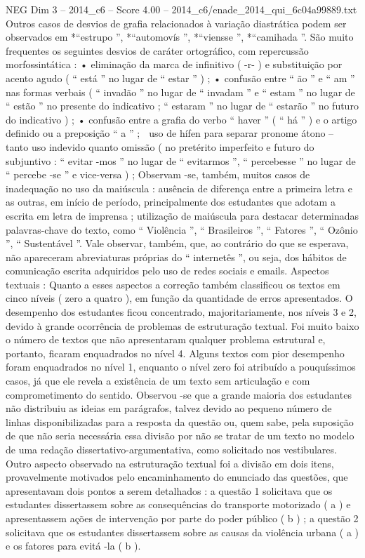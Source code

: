 \begin{textsample}{NEG Dim 3 – 2014\_c6 – Score 4.00 – 2014\_c6/enade\_2014\_qui\_6c04a99889.txt}
Outros casos de desvios de grafia relacionados à variação diastrática podem ser observados em *“estrupo ”, *“automovís ”, *“viensse ”, *“camihada ”.
São muito frequentes os seguintes desvios de caráter ortográfico, com repercussão morfossintática : • eliminação da marca de infinitivo ( -r- ) e substituição por acento agudo ( “ está ” no lugar de “ estar ” ) ; • confusão entre “ ão ” e “ am ” nas formas verbais ( “ invadão ” no lugar de “ invadam ” e “ estam ” no lugar de “ estão ” no presente do indicativo ; “ estaram ” no lugar de “ estarão ” no futuro do indicativo ) ; • confusão entre a grafia do verbo “ haver ” ( “ há ” ) e o artigo definido ou a preposição “ a ” ;  uso de hífen para separar pronome átono – tanto uso indevido quanto omissão ( no pretérito imperfeito e futuro do subjuntivo : “ evitar -mos ” no lugar de “ evitarmos ”, “ percebesse ” no lugar de “ percebe -se ” e vice-versa ) ; Observam -se, também, muitos casos de inadequação no uso da maiúscula : ausência de diferença entre a primeira letra e as outras, em início de período, principalmente dos estudantes que adotam a escrita em letra de imprensa ; utilização de maiúscula para destacar determinadas palavras-chave do texto, como “ Violência ”, “ Brasileiros ”, “ Fatores ”, “ Ozônio ”, “ Sustentável ”.
Vale observar, também, que, ao contrário do que se esperava, não apareceram abreviaturas próprias do “ internetês ”, ou seja, dos hábitos de comunicação escrita adquiridos pelo uso de redes sociais e emails.
Aspectos textuais : Quanto a esses aspectos a correção também classificou os textos em cinco níveis ( zero a quatro ), em função da quantidade de erros apresentados.
O desempenho dos estudantes ficou concentrado, majoritariamente, nos níveis 3 e 2, devido à grande ocorrência de problemas de estruturação textual.
Foi muito baixo o número de textos que não apresentaram qualquer problema estrutural e, portanto, ficaram enquadrados no nível 4.
Alguns textos com pior desempenho foram enquadrados no nível 1, enquanto o nível zero foi atribuído a pouquíssimos casos, já que ele revela a existência de um texto sem articulação e com comprometimento do sentido.
Observou -se que a grande maioria dos estudantes não distribuiu as ideias em parágrafos, talvez devido ao pequeno número de linhas disponibilizadas para a resposta da questão ou, quem sabe, pela suposição de que não seria necessária essa divisão por não se tratar de um texto no modelo de uma redação dissertativo-argumentativa, como solicitado nos vestibulares.
Outro aspecto observado na estruturação textual foi a divisão em dois itens, provavelmente motivados pelo encaminhamento do enunciado das questões, que apresentavam dois pontos a serem detalhados : a questão 1 solicitava que os estudantes dissertassem sobre as consequências do transporte motorizado ( a ) e apresentassem ações de intervenção por parte do poder público ( b ) ; a questão 2 solicitava que os estudantes dissertassem sobre as causas da violência urbana ( a ) e os fatores para evitá -la ( b ).

\end{textsample}

